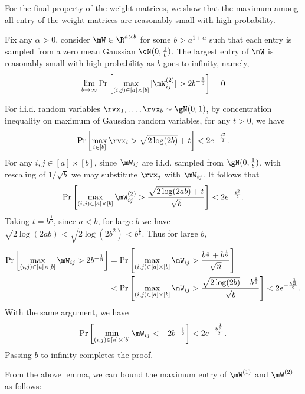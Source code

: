 For the final property of the weight matrices, we show that the maximum among all entry of the weight matrices are reasonably small with high probability.
\begin{lemma}
\label{lemma:w-not-too-large}Fix any $\alpha>0$, consider $\mW\in\R^{a\times b}$ for some $b>a^{1+\alpha}$ such that each entry is sampled from a zero mean Gaussian $\cN(0, \frac1b)$. The largest entry of $\mW$ is reasonably small with high probability as $b$ goes to infinity, namely,
\begin{equation}
\lim_{b\to\infty}\Pr\left[\max_{(i,j)\in[a]\times[b]}|\mW^{(2)}_{ij}| > 2b^{-\frac13}\right] = 0
\end{equation}
\end{lemma}

\begin{proofof}{}
For i.i.d. random variables $\rvx_1,\dots, \rvx_b\sim \gN(0,1)$,
by concentration inequality on maximum of Gaussian random variables, for any $t>0$, we have
\begin{equation}
    \Pr\left[\max_{i\in[b]}\rvx_i > \sqrt{2\log (2b)} + t\right] < 2e^{-\frac{t^2}{2}}.
\end{equation}
For any $i,j\in[a]\times [b]$, since $\mW_{ij}$ are i.i.d. sampled from $\gN(0,\frac1b)$, with rescaling of $1/\sqrt{b}$ we may substitute $\rvx_j$ with $\mW_{ij}$. It follows that
\begin{equation}
    \Pr\left[\max_{(i,j)\in[a]\times[b]}\mW^{(2)}_{ij} > \frac{\sqrt{2\log (2ab)} + t}{\sqrt{b}}\right] < 2e^{-\frac{t^2}{2}}.
\end{equation}
Taking $t=b^{\frac16}$, since $a<b$, for large $b$ we have $\sqrt{2\log (2ab)} < \sqrt{2\log (2b^2)} < b^{\frac16}$. Thus for large $b$,
\begin{equation}
\begin{split}
    \Pr\left[\max_{(i,j)\in[a]\times[b]}\mW_{ij} > 2b^{-\frac13}\right] &= \Pr\left[\max_{(i,j)\in[a]\times[b]}\mW_{ij} > \frac{b^{\frac16} + b^{\frac16}}{\sqrt{n}}\right]\\
    & < \Pr\left[\max_{(i,j)\in[a]\times[b]}\mW_{ij} > \frac{\sqrt{2\log (2b)} + b^{\frac16}}{\sqrt{b}}\right] < 2e^{-\frac{b^{\frac13}}{2}}.
\end{split}
\end{equation}
With the same argument, we have
\begin{equation}
    \Pr\left[\min_{(i,j)\in[a]\times[b]}\mW_{ij} < -2b^{-\frac13}\right] < 2e^{-\frac{b^{\frac13}}{2}}.
\end{equation}
Passing $b$ to infinity completes the proof.
\end{proofof}
From the above lemma, we can bound the maximum entry of $\mW^{(1)}$ and $\mW^{(2)}$ as follows:

